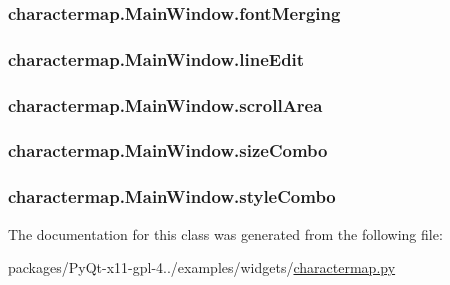 \subsubsection[{font\+Merging}]{\setlength{\rightskip}{0pt plus 5cm}charactermap.\+Main\+Window.\+font\+Merging}\label{classcharactermap_1_1MainWindow_a2242f53208078921b183b42329e0f870}
\hypertarget{classcharactermap_1_1MainWindow_af5960587a064fe0b1ee7455eb215009b}{}
\subsubsection[{line\+Edit}]{\setlength{\rightskip}{0pt plus 5cm}charactermap.\+Main\+Window.\+line\+Edit}\label{classcharactermap_1_1MainWindow_af5960587a064fe0b1ee7455eb215009b}
\hypertarget{classcharactermap_1_1MainWindow_a40e04418149761f63477f32e8bfe173a}{}
\subsubsection[{scroll\+Area}]{\setlength{\rightskip}{0pt plus 5cm}charactermap.\+Main\+Window.\+scroll\+Area}\label{classcharactermap_1_1MainWindow_a40e04418149761f63477f32e8bfe173a}
\hypertarget{classcharactermap_1_1MainWindow_a6ee4cb963b9643705dce6347ebd30156}{}
\subsubsection[{size\+Combo}]{\setlength{\rightskip}{0pt plus 5cm}charactermap.\+Main\+Window.\+size\+Combo}\label{classcharactermap_1_1MainWindow_a6ee4cb963b9643705dce6347ebd30156}
\hypertarget{classcharactermap_1_1MainWindow_a1b24d94191ccb2786d027a30b7bd0939}{}
\subsubsection[{style\+Combo}]{\setlength{\rightskip}{0pt plus 5cm}charactermap.\+Main\+Window.\+style\+Combo}\label{classcharactermap_1_1MainWindow_a1b24d94191ccb2786d027a30b7bd0939}


The documentation for this class was generated from the following file\+:\begin{DoxyCompactItemize}
\item 
packages/\+Py\+Qt-\/x11-\/gpl-\/4../examples/widgets/\hyperlink{charactermap_8py}{charactermap.\+py}\end{DoxyCompactItemize}
